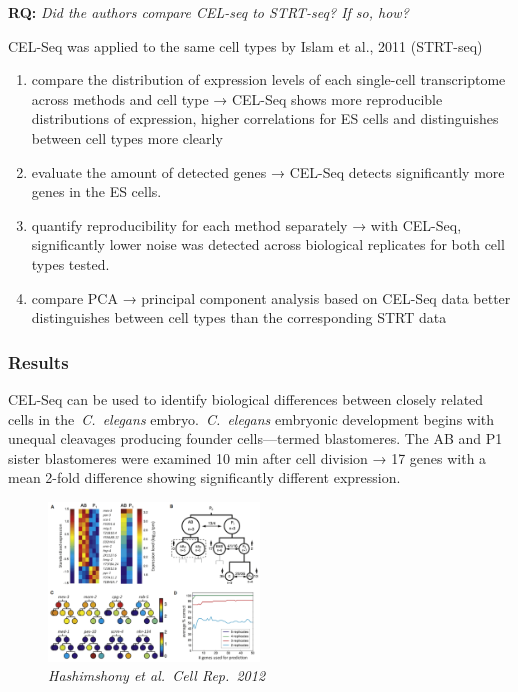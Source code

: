 \begin{tcolorbox}
[width=\linewidth, sharp corners=all, colback=white!95!black]

\textbf{RQ: }\emph{Did the authors compare CEL-seq to STRT-seq? If so, how?}

CEL-Seq was applied to the same cell types by Islam et al., 2011
(STRT-seq)

\begin{enumerate}
\def\labelenumi{\arabic{enumi}.}
\tightlist
\item
  compare the distribution of expression levels of each single-cell
  transcriptome across methods and cell type → CEL-Seq shows more
  reproducible distributions of expression, higher correlations for ES
  cells and distinguishes between cell types more clearly
\item
  evaluate the amount of detected genes → CEL-Seq detects significantly
  more genes in the ES cells.
\item
  quantify reproducibility for each method separately → with CEL-Seq,
  significantly lower noise was detected across biological replicates
  for both cell types tested.
\item
  compare PCA → principal component analysis based on CEL-Seq data
  better distinguishes between cell types than the corresponding STRT
  data
\end{enumerate}
\end{tcolorbox}

\hypertarget{results-2}{%
\subsubsection{Results}\label{results-2}}

CEL-Seq can be used to identify biological differences between closely
related cells in the~\emph{C.~elegans} embryo.~\emph{C.~elegans}
embryonic development begins with unequal cleavages producing founder
cells---termed blastomeres. The AB and P1 sister blastomeres were
examined 10 min after cell division → 17 genes with a mean 2-fold
difference showing significantly different expression.

\begin{figure}
\centering
\includegraphics[width=0.5\textwidth]{images/Screen_Shot_2023-02-20_at_19-30-17.png}
\caption{\emph{Hashimshony et al.~Cell Rep.~2012}}
\end{figure}

